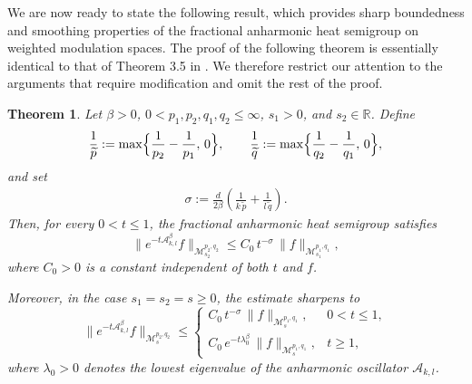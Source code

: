 \documentclass[12pt,reqno,a4paper]{amsart}
\numberwithin{equation}{section}
\theoremstyle{plain}
\newtheorem{theorem}{Theorem}[section]
\theoremstyle{definition}
\theoremstyle{remark}
\begin{document}
We are now ready to state the following result, which provides sharp boundedness and smoothing properties of the fractional anharmonic heat semigroup on weighted modulation spaces. The proof of the following theorem is essentially identical to that of Theorem 3.5 in \cite{dasgupta2026phase}. We therefore restrict our attention to the arguments that require modification and omit the rest of the proof.

\begin{theorem}
\label{BoundofH}
Let $\beta>0$, $0<p_{1},p_{2},q_{1},q_{2}\leq\infty$, $s_{1}>0$, and $s_{2}\in\mathbb{R}$. Define
\begin{align*}
\frac{1}{\widetilde{p}}
:=
\max\Bigl\{\frac{1}{p_{2}}-\frac{1}{p_{1}},\,0\Bigr\},
\qquad
\frac{1}{\widetilde{q}}
:=
\max\Bigl\{\frac{1}{q_{2}}-\frac{1}{q_{1}},\,0\Bigr\},
\end{align*}
and set
\begin{align}
\label{sigma}
\sigma
:=
\frac{d}{2\beta}
\left(
\frac{1}{k\,\widetilde{p}}
+
\frac{1}{l\,\widetilde{q}}
\right).
\end{align}
Then, for every $0<t\leq1$, the fractional anharmonic heat semigroup satisfies
\begin{equation}
\label{maininequality}
\bigl\|e^{-t\mathcal{A}_{k,l}^{\beta}}f\bigr\|_{\mathcal{M}^{p_{2},q_{2}}_{s_{2}}}
\le
C_{0}\,t^{-\sigma}\,
\|f\|_{\mathcal{M}^{p_{1},q_{1}}_{s_{1}}},
\end{equation}
where $C_{0}>0$ is a constant independent of both $t$ and $f$.

Moreover, in the case $s_{1}=s_{2}=s\ge0$, the estimate sharpens to
\begin{equation}
\label{secondconstant}
\bigl\|e^{-t\mathcal{A}_{k,l}^{\beta}}f\bigr\|_{\mathcal{M}^{p_{2},q_{2}}_{s}}
\le
\begin{cases}
C_{0}\,t^{-\sigma}\,\|f\|_{\mathcal{M}^{p_{1},q_{1}}_{s}}, & 0<t\le1,\\[0.3em]
C_{0}\,e^{-t\lambda_{0}^{\beta}}\,\|f\|_{\mathcal{M}^{p_{1},q_{1}}_{s}}, & t\ge1,
\end{cases}
\end{equation}
where $\lambda_{0}>0$ denotes the lowest eigenvalue of the anharmonic oscillator $\mathcal{A}_{k,l}$.
\end{theorem}
\end{document}
